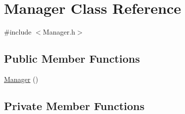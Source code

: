 \hypertarget{classManager}{}\section{Manager Class Reference}
\label{classManager}


{\ttfamily \#include $<$Manager.\+h$>$}

\subsection*{Public Member Functions}
\begin{DoxyCompactItemize}
\item 
\hyperlink{classManager_a1658ff9f18e38ccd9cb8b0b371b9c20b}{Manager} ()
\end{DoxyCompactItemize}
\subsection*{Private Member Functions}
